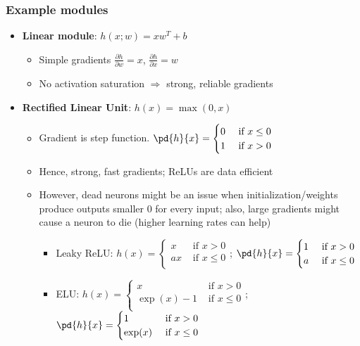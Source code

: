 \subsubsection{Example modules}
\begin{itemize}
	\item \textbf{Linear module}: $h(x;w) = x w^T + b$
	\begin{itemize}
		\item Simple gradients $\frac{\partial h}{\partial w} = x$, $\frac{\partial h}{\partial x} = w$
		\item No activation saturation $\Rightarrow$ strong, reliable gradients
	\end{itemize}
	\item \textbf{Rectified Linear Unit}: $h(x) = \max(0,x)$
	\begin{itemize}
		\item Gradient is step function. $\pd{h}{x} = \begin{cases}
		0 & \text{ if } x\leq 0\\
		1 & \text{ if } x > 0\\
		\end{cases}$
		\item Hence, strong, fast gradients; ReLUs are data efficient
		\item However, dead neurons might be an issue when initialization/weights produce outputs smaller 0 for every input; also, large gradients might cause a neuron to die (higher learning rates can help)
		\begin{itemize}
			\item Leaky ReLU: $h(x) = \begin{cases} x & \text{ if } x > 0\\ ax & \text{ if } x \leq 0\\ \end{cases}$;
					$\pd{h}{x} = \begin{cases} 1 & \text{ if } x > 0\\ a & \text{ if } x \leq 0\\ \end{cases}$
			\item ELU: $h(x) = \begin{cases} x & \text{ if } x > 0\\ \exp (x) - 1 & \text{ if } x \leq 0\\ \end{cases}$;
					$\pd{h}{x} = \begin{cases} 1 & \text{ if } x > 0\\ \exp (x) & \text{ if } x \leq 0\\ \end{cases}$

\end{itemize}
\end{itemize}
\end{itemize}
